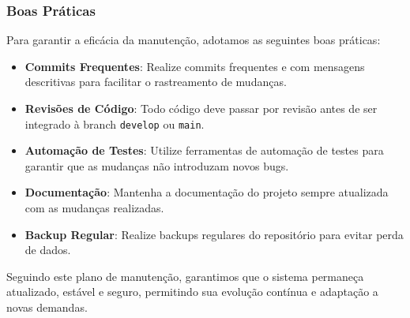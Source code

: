 \documentclass[../main.tex]{subfiles}
\begin{document}
\subsubsection{Boas Práticas}

Para garantir a eficácia da manutenção, adotamos as seguintes boas práticas:

\begin{itemize}
    \item \textbf{Commits Frequentes}: Realize commits frequentes e com mensagens descritivas para facilitar o rastreamento de mudanças.
    \item \textbf{Revisões de Código}: Todo código deve passar por revisão antes de ser integrado à branch \texttt{develop} ou \texttt{main}.
    \item \textbf{Automação de Testes}: Utilize ferramentas de automação de testes para garantir que as mudanças não introduzam novos bugs.
    \item \textbf{Documentação}: Mantenha a documentação do projeto sempre atualizada com as mudanças realizadas.
    \item \textbf{Backup Regular}: Realize backups regulares do repositório para evitar perda de dados.
\end{itemize}

Seguindo este plano de manutenção, garantimos que o sistema permaneça atualizado, estável e seguro, permitindo sua evolução contínua e adaptação a novas demandas.


\end{document}
